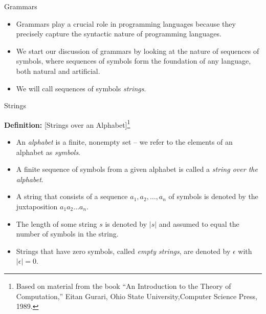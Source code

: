 \documentclass{beamer}
\begin{document}
\begin{frame}[fragile]{Grammars}

\begin{itemize}
\item
Grammars play a crucial role in programming languages because they precisely capture the
syntactic nature of programming languages.

\item
We start our discussion of grammars by looking at the nature of sequences of symbols,
where sequences of symbols form the foundation of any language, both natural and
artificial.

\item
We will call sequences of symbols {\em strings}.

\end{itemize}


\end{frame}

\begin{frame}[fragile]{Strings}

\small

{\bf Definition:} [Strings over an Alphabet]\footnote{\tiny Based on material from the book ``An Introduction to the Theory of Computation,'' Eitan Gurari, Ohio State University,Computer Science Press, 1989.}
\begin{itemize}
\item
An {\em alphabet} is a finite, nonempty set -- we refer to the elements of an alphabet as {\em symbols}.
\item
A finite sequence of symbols from a given alphabet is called a {\em string over the alphabet}.
\item
A string that consists of a sequence $a_1, a_2,\ldots, a_n$ of symbols is denoted by the juxtaposition $a_1a_2\ldots a_n$.
\item
The length of some string $s$  is denoted by $|s|$ and assumed to equal the number of symbols in the string.
\item
Strings that have zero symbols, called {\em empty strings}, are denoted by $\epsilon$ with $|\epsilon|=0$.
\end{itemize}
\end{frame}
\end{document}
